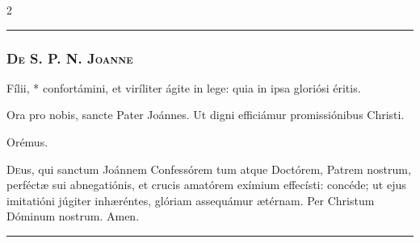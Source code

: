 \documentclass[9pt,twoside]{extarticle}
\begin{document}
\begin{multicols}{2}
\begin{center}\textcolor{red}{\rule{\linewidth}{0.5pt}} \end{center}

\subsubsection*{\center \textsc{De S. P. N. Joanne}}
\begin{tightlist}{}
\item {} Fílii, * confortámini, et viríliter ágite in lege: quia in ipsa gloriósi éritis.
\item {} Ora pro nobis, sancte Pater Joánnes.  Ut digni efficiámur promissiónibus Christi.
\item Orémus. \hfill {}
\end{tightlist}
\lettrine{D}eus, qui sanctum Joánnem Confessórem tum atque Doctórem, Patrem nostrum, perféctæ sui abnegatiónis, et crucis amatórem exímium effecísti: concéde; ut ejus imitatióni júgiter inhæréntes, glóriam assequámur ætérnam. Per Christum Dóminum nostrum.  Amen.

\begin{center}\textcolor{red}{\rule{\linewidth}{0.5pt}} \end{center}
\end{multicols}
\end{document}
